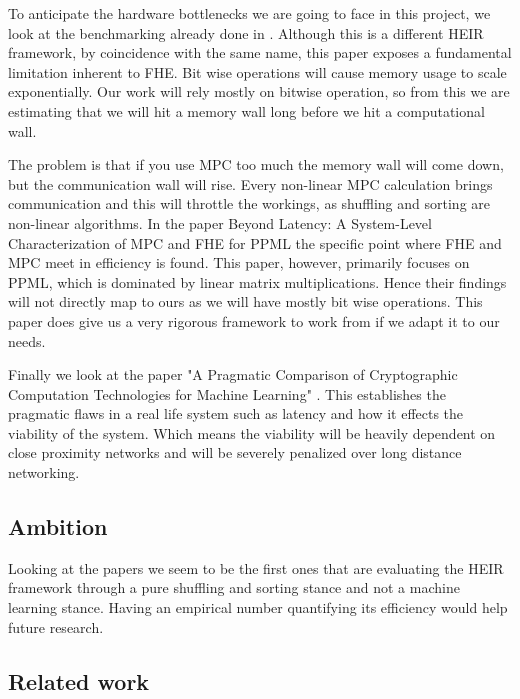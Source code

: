 To anticipate the hardware bottlenecks we are going to face in this project, we look at the benchmarking already done in \cite{bian2023heir}. Although this is a different HEIR framework, by coincidence with the same name, this paper exposes a fundamental limitation inherent to FHE. Bit wise operations will cause memory usage to scale exponentially. Our work will rely mostly on bitwise operation, so from this we are estimating that we will hit a memory wall long before we hit a computational wall.

The problem is that if you use MPC too much the memory wall will come down, but the communication wall will rise. Every non-linear MPC calculation brings communication and this will throttle the workings, as shuffling and sorting are non-linear algorithms. In the paper Beyond Latency: A System-Level Characterization of MPC and FHE for PPML \cite{huang2026beyond} the specific point where FHE and MPC meet in efficiency is found. This paper, however,  primarily focuses on PPML, which is dominated by linear matrix multiplications. Hence their findings will not directly map to ours as we will have mostly bit wise operations. This paper does give us a very rigorous framework to work from if we adapt it to our needs.

Finally we look at the paper "A Pragmatic Comparison of Cryptographic Computation Technologies for Machine Learning" \cite{taubert2026pragmatic}. This establishes the pragmatic flaws in a real life system such as latency and how it effects the viability of the system. Which means the viability will be heavily dependent on close proximity networks and will be severely penalized over long distance networking.


\subsection{Ambition}                                    %
Looking at the papers we seem to be the first ones that are evaluating the HEIR framework through a pure shuffling and sorting stance and not a machine learning stance. Having an empirical number quantifying its efficiency would help future research. 

\subsection{Related work}                                %

